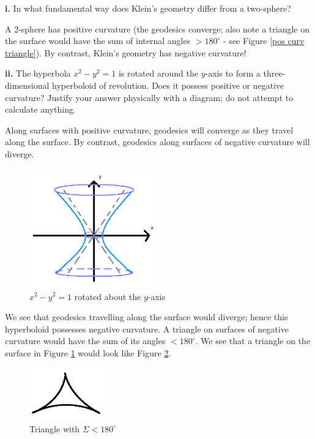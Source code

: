 \documentclass[a4paper]{article} %
\begin{document}
\begin{framed}
\textbf{i.} In what fundamental way does Klein's geometry differ from a two-sphere?
\end{framed}

A 2-sphere has positive curvature (the geodesics converge; also note a triangle on the surface would have the sum of internal angles $>180^{\circ}$ - see Figure \ref{pos curv triangle}). By contrast, Klein's geometry has negative curvature!

\pagebreak  %

\begin{framed}
\textbf{ii.} The hyperbola $x^2-y^2=1$ is rotated around the $y$-axis to form a three-dimensional hyperboloid of revolution. Does it possess positive or negative curvature? Justify your answer physically with a diagram; do not attempt to calculate anything.
\end{framed}

Along surfaces with positive curvature, geodesics will converge as they travel along the surface. By contrast, geodesics along surfaces of negative curvature will diverge.

\begin{figure}[h]
\centering
\includegraphics[width=0.5\textwidth]{images/dii.png}
\caption{$x^2-y^2=1$ rotated about the $y$-axis}
\label{dii figure}
\end{figure}

We see that geodesics travelling along the surface would diverge; hence this hyperboloid possesses negative curvature. A triangle on surfaces of negative curvature would have the sum of its angles $< 180^{\circ}$. We see that a triangle on the surface in Figure \ref{dii figure} would look like Figure \ref{neg curv triangle}.

\begin{figure}[h]
\centering
\includegraphics[width=0.3\textwidth]{images/negativeCurvTriangle.png}
\caption{Triangle with $\Sigma<180^{\circ}$}
\label{neg curv triangle}
\end{figure}
\end{document}
